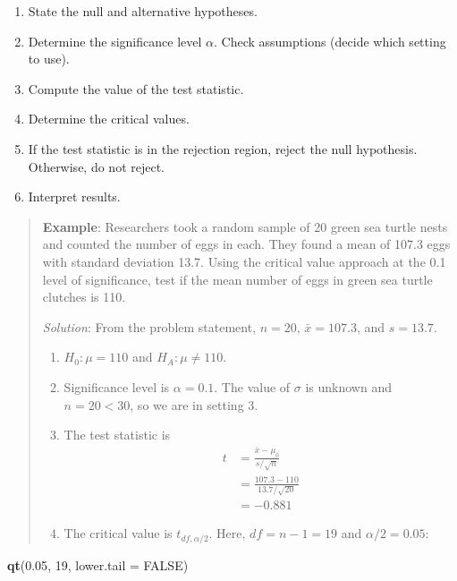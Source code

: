 \documentclass[
]{book}
\newenvironment{Shaded}{\begin{snugshade}}{\end{snugshade}}
\newcommand{\AttributeTok}[1]{\textcolor[rgb]{0.13,0.29,0.53}{#1}}
\newcommand{\ConstantTok}[1]{\textcolor[rgb]{0.56,0.35,0.01}{#1}}
\newcommand{\DecValTok}[1]{\textcolor[rgb]{0.00,0.00,0.81}{#1}}
\newcommand{\FloatTok}[1]{\textcolor[rgb]{0.00,0.00,0.81}{#1}}
\newcommand{\FunctionTok}[1]{\textcolor[rgb]{0.13,0.29,0.53}{\textbf{#1}}}
\newcommand{\NormalTok}[1]{#1}
\providecommand{\tightlist}{%
  \setlength{\itemsep}{0pt}\setlength{\parskip}{0pt}}
\begin{document}
\begin{enumerate}
\def\labelenumi{\arabic{enumi}.}
\tightlist
\item
  State the null and alternative hypotheses.
\item
  Determine the significance level \(\alpha\). Check assumptions (decide which setting to use).
\item
  Compute the value of the test statistic.
\item
  Determine the critical values.
\item
  If the test statistic is in the rejection region, reject the null hypothesis. Otherwise, do not reject.
\item
  Interpret results.
\end{enumerate}

\begin{quote}
\textbf{Example}: Researchers took a random sample of 20 green sea turtle nests and counted the number of eggs in each. They found a mean of 107.3 eggs with standard deviation 13.7. Using the critical value approach at the 0.1 level of significance, test if the mean number of eggs in green sea turtle clutches is 110.

\emph{Solution}: From the problem statement, \(n=20\), \(\bar{x}=107.3\), and \(s=13.7\).

\begin{enumerate}
\def\labelenumi{\arabic{enumi}.}
\tightlist
\item
  \(H_0: \mu = 110\) and \(H_A: \mu \ne 110\).
\item
  Significance level is \(\alpha=0.1\). The value of \(\sigma\) is unknown and \(n = 20 < 30\), so we are in setting 3.
\item
  The test statistic is \begin{align} t &= \frac{\bar{x}-\mu_0}{s/\sqrt{n}} \\ &= \frac{107.3-110}{13.7/\sqrt{20}} \\ &= -0.881 \end{align}
\item
  The critical value is \(t_{df, \alpha/2}\). Here, \(df=n-1=19\) and \(\alpha/2 = 0.05\):
\end{enumerate}
\end{quote}

\begin{Shaded}
\begin{Highlighting}[]
\FunctionTok{qt}\NormalTok{(}\FloatTok{0.05}\NormalTok{, }\DecValTok{19}\NormalTok{, }\AttributeTok{lower.tail =} \ConstantTok{FALSE}\NormalTok{)}
\end{Highlighting}
\end{Shaded}
\end{document}
